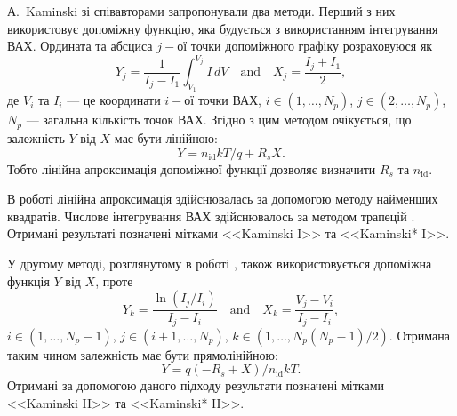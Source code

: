 А.~Kaminski зі співавторами \cite{Kaminski} запропонували два методи.
Перший з них використовує допоміжну функцію, яка будується з використанням інтегрування ВАХ.
Ордината та абсциса $j-$ої точки допоміжного графіку розраховуюся як
\begin{equation}
\label{eqKam1}
Y_j=\frac{1}{I_j-I_1}\int_{V_1}^{V_j}I\,dV \quad\text{and}\quad X_j=\frac{I_j+I_1}{2},
\end{equation}
де
$V_i$ та $I_i$ --- це координати $i-$ої точки ВАХ,
$i\in(1,\ldots, N_p)$,
$j\in(2,\ldots, N_p)$,
$N_p$ --- загальна кількість точок ВАХ.
Згідно з цим методом очікується, що залежність $Y$ від $X$ має бути лінійною:
\begin{equation}
\label{eqKam1Det}
Y=n_\mathrm{id}kT/q+R_sX.
\end{equation}
Тобто лінійна апроксимація допоміжної функції дозволяє визначити $R_s$ та $n_\mathrm{id}$.

В роботі лінійна апроксимація здійснювалась за допомогою методу найменших квадратів.
Числове інтегрування ВАХ здійснювалось за методом трапецій \cite[с.~98]{KalitkinBook}.
Отримані результаті позначені мітками <<Kaminski I>> та <<Kaminski* I>>.

У другому методі, розглянутому в роботі \cite{Kaminski}, також використовується допоміжна функція $Y$ від $X$, проте
\begin{equation}
\label{eqKam2}
Y_k=\frac{\ln(I_j/I_i)}{I_j-I_i} \quad\text{and}\quad X_k=\frac{V_j-V_i}{I_j-I_i},
\end{equation}
$i\in(1,\ldots, N_p-1)$,
$j\in(i+1,\ldots, N_p)$,
$k\in(1,\ldots, N_p(N_p-1)/2)$.
Отримана таким чином залежність має бути прямолінійною:
\begin{equation}
\label{eqKam2Det}
Y=q(-R_s+X)/n_\mathrm{id}kT.
\end{equation}
Отримані за допомогою даного підходу результати позначені мітками <<Kaminski II>> та <<Kaminski* II>>.

